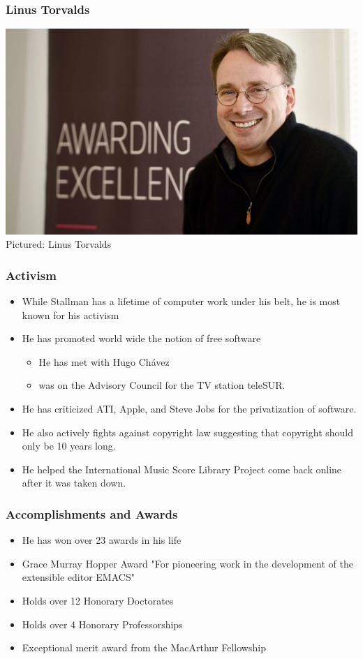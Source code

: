\documentclass{beamer}
\begin{document}
\begin{frame}\frametitle{Linus Torvalds}
  \begin{center}
    \includegraphics[scale=1.6, center]{linus1.jpg}\\
    \small{Pictured: Linus Torvalds}
  \end{center}
\end{frame}

\begin{frame}\frametitle{Activism}
  \begin{itemize}
    \item While Stallman has a lifetime of computer work under his belt, he is most known for his activism
    \item He has promoted world wide the notion of free software
    \begin{itemize}
      \item He has met with Hugo Ch{\'a}vez
      \item was on the Advisory Council for the TV station teleSUR.
    \end{itemize}
    \item He has criticized ATI, Apple, and Steve Jobs for the privatization of software.
    \item He also actively fights against copyright law suggesting that copyright should only be 10 years long.
    \item He helped the International Music Score Library Project come back online after it was taken down.
  \end{itemize}
\end{frame}

\begin{frame}\frametitle{Accomplishments and Awards}
  \begin{itemize}
    \item He has won over 23 awards in his life
    \item Grace Murray Hopper Award "For pioneering work in the development of the extensible editor EMACS"
    \item Holds over 12 Honorary Doctorates
    \item Holds over 4 Honorary Professorships
    \item Exceptional merit award from the MacArthur Fellowship
  \end{itemize}
\end{frame}
\end{document}
